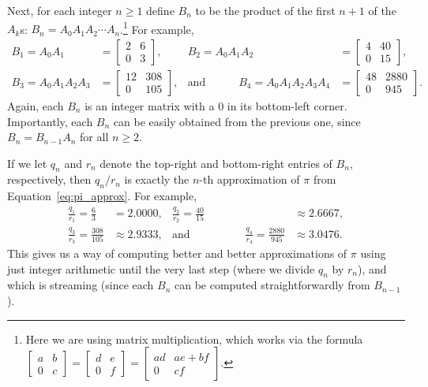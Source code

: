 Next, for each integer $n \geq 1$ define $B_n$ to be the product of the first $n+1$ of the $A_k$s: $B_n = A_0A_1A_2\cdots A_n$.\footnote{Here we are using matrix multiplication, which works via the formula $\begin{bmatrix}a & b \\ 0 & c\end{bmatrix} = \begin{bmatrix}d & e \\ 0 & f\end{bmatrix} = \begin{bmatrix}ad & ae+bf \\ 0 & cf\end{bmatrix}$.} For example,
\begin{align*}
	B_1 = A_0A_1 & = \begin{bmatrix}
		2 & 6 \\
		0 & 3
	\end{bmatrix}, & B_2 = A_0A_1A_2 & = \begin{bmatrix}
		4 & 40 \\
		0 & 15
	\end{bmatrix}, \\
	B_3 = A_0A_1A_2A_3 & = \begin{bmatrix}
		12 & 308 \\
		0 & 105
	\end{bmatrix}, & \text{and} \qquad\quad B_4 = A_0A_1A_2A_3A_4 & = \begin{bmatrix}
		48 & 2880 \\
		0 & 945
	\end{bmatrix}.
\end{align*}
Again, each $B_n$ is an integer matrix with a $0$ in its bottom-left corner. Importantly, each $B_n$ can be easily obtained from the previous one, since $B_n = B_{n-1}A_n$ for all $n \geq 2$.

If we let $q_n$ and $r_n$ denote the top-right and bottom-right entries of $B_n$, respectively, then $q_n / r_n$ is exactly the $n$-th approximation of $\pi$ from Equation~\eqref{eq:pi_approx}. For example,
\begin{align*}
	\frac{q_1}{r_1} = \frac{6}{3} & = 2.0000, & \frac{q_2}{r_2} = \frac{40}{15} & \approx 2.6667, \\
	\frac{q_3}{r_3} = \frac{308}{105} & \approx 2.9333, &  \text{and} \qquad\qquad\quad \frac{q_4}{r_4} = \frac{2880}{945} & \approx 3.0476.
\end{align*}
This gives us a way of computing better and better approximations of $\pi$ using just integer arithmetic until the very last step (where we divide $q_n$ by $r_n$), and which is streaming (since each $B_n$ can be computed straightforwardly from $B_{n-1}$).

